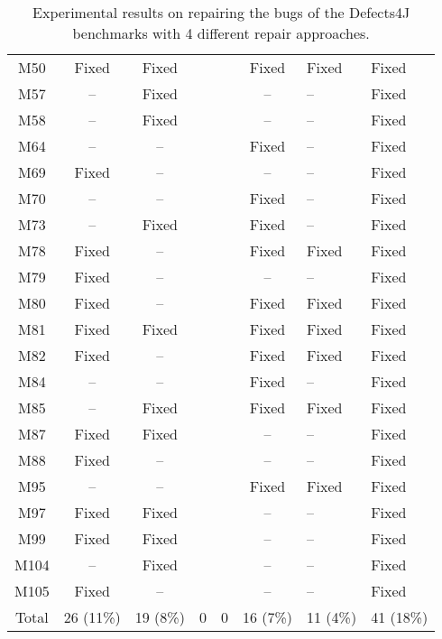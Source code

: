 \begin{table}[!t]
{\begin{tabular}{|c|c|c|c|c|c|}
M50    & Fixed   & Fixed  &          &           & Fixed   & Fixed & Fixed\\
M57    & --      & Fixed  &          &           & --      & --   & Fixed\\
M58    & --      & Fixed  &          &           & --      & --   & Fixed\\
M64    & --      & --     &          &           & Fixed   & --   & Fixed\\
M69    & Fixed   & --     &          &           & --      & --   & Fixed\\
M70    & --      & --     &          &           & Fixed   & --   & Fixed\\
M73    & --      & Fixed  &          &           & Fixed   & --   & Fixed\\
M78    & Fixed   & --     &          &           & Fixed   & Fixed & Fixed\\
M79    & Fixed   & --     &          &           & --      & --   & Fixed\\
M80    & Fixed   & --     &          &           & Fixed   & Fixed & Fixed\\
M81    & Fixed   & Fixed  &          &           & Fixed   & Fixed & Fixed\\
M82    & Fixed   & --     &          &           & Fixed   & Fixed & Fixed\\
M84    & --      & --     &          &           & Fixed   & --   & Fixed\\
M85    & --      & Fixed  &          &           & Fixed   & Fixed & Fixed\\
M87    & Fixed   & Fixed  &          &           & --      & --   & Fixed\\
M88    & Fixed   & --     &          &           & --      & --   & Fixed\\
M95    & --      & --     &          &           & Fixed   & Fixed & Fixed\\
M97    & Fixed   & Fixed  &          &           & --      & --   & Fixed\\
M99    & Fixed   & Fixed  &          &           & --      & --   & Fixed\\
M104   & --      & Fixed  &          &           & --      & --   & Fixed\\
M105   & Fixed   & --     &          &           & --      & --   & Fixed\\
\hline
\hline
Total  & 26 (11\%) & 19 (8\%) & 0        & 0         & 16 (7\%) & 11 (4\%) & 41 (18\%)\\
\hline 
\end{tabular}%
}
\caption{Experimental results on repairing the bugs of the Defects4J benchmarks with 4 different repair approaches.}
\end{table}
